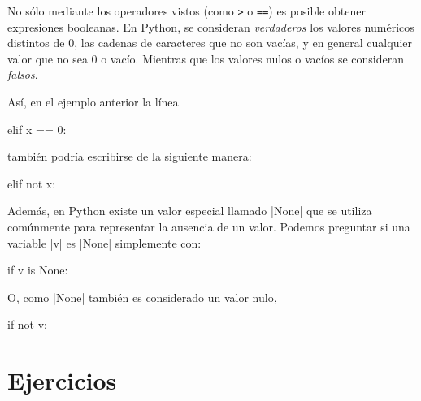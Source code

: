 \begin{sabias_que}
No sólo mediante los operadores vistos (como \lstinline!>! o \lstinline!==!)
es posible obtener expresiones booleanas.  En Python, se consideran
\textit{verdaderos} los valores numéricos distintos de 0, las cadenas de
caracteres que no son vacías, y en general cualquier valor que no sea 0 o
vacío.  Mientras que los valores nulos o vacíos se consideran \textit{falsos}.

Así, en el ejemplo anterior la línea

\begin{codigo-python-sn}
elif x == 0:
\end{codigo-python-sn}

también podría escribirse de la siguiente manera:

\begin{codigo-python-sn}
elif not x:
\end{codigo-python-sn}

Además, en Python existe un valor especial llamado |None| que se utiliza
comúnmente para representar la ausencia de un valor. Podemos preguntar si una
variable |v| es |None| simplemente con:

\begin{codigo-python-sn}
if v is None:
\end{codigo-python-sn}

O, como |None| también es considerado un valor nulo,

\begin{codigo-python-sn}
if not v:
\end{codigo-python-sn}
\end{sabias_que}


\section{Ejercicios}


